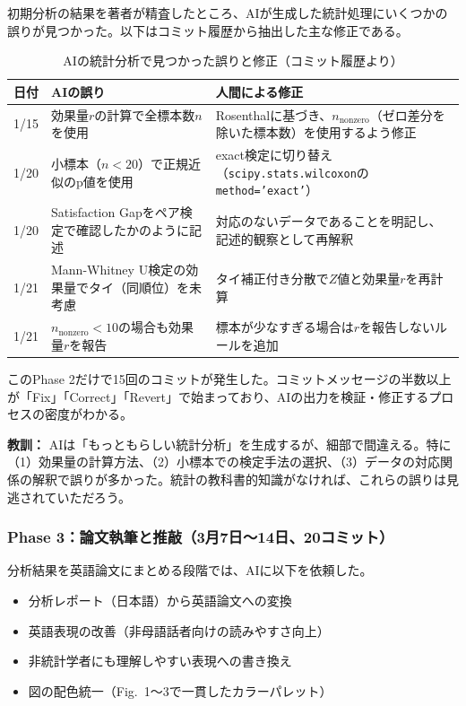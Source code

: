 初期分析の結果を著者が精査したところ、AIが生成した統計処理にいくつかの誤りが見つかった。以下はコミット履歴から抽出した主な修正である。

\begin{table}[htbp]
\caption{AIの統計分析で見つかった誤りと修正（コミット履歴より）}
\label{tab:ai-stat-errors}
\centering
\footnotesize
\begin{tabular}{lp{5cm}p{4cm}}
\toprule
日付 & AIの誤り & 人間による修正 \\
\midrule
1/15 & 効果量$r$の計算で全標本数$n$を使用 & Rosenthal\cite{rosenthal1991}に基づき、$n_{\text{nonzero}}$（ゼロ差分を除いた標本数）を使用するよう修正 \\
1/20 & 小標本（$n<20$）で正規近似のp値を使用 & exact検定に切り替え（\texttt{scipy.stats.wilcoxon}の\texttt{method='exact'}） \\
1/20 & Satisfaction Gapをペア検定で確認したかのように記述 & 対応のないデータであることを明記し、記述的観察として再解釈 \\
1/21 & Mann-Whitney U検定の効果量でタイ（同順位）を未考慮 & タイ補正付き分散で$Z$値と効果量$r$を再計算 \\
1/21 & $n_{\text{nonzero}}<10$の場合も効果量$r$を報告 & 標本が少なすぎる場合は$r$を報告しないルールを追加 \\
\bottomrule
\end{tabular}
\end{table}

このPhase 2だけで15回のコミットが発生した。コミットメッセージの半数以上が「Fix」「Correct」「Revert」で始まっており、AIの出力を検証・修正するプロセスの密度がわかる。

\begin{screen}
\textbf{教訓：} AIは「もっともらしい統計分析」を生成するが、細部で間違える。特に（1）効果量の計算方法、（2）小標本での検定手法の選択、（3）データの対応関係の解釈で誤りが多かった。統計の教科書的知識がなければ、これらの誤りは見逃されていただろう。
\end{screen}

\subsubsection{Phase 3：論文執筆と推敲（3月7日〜14日、20コミット）}

分析結果を英語論文にまとめる段階では、AIに以下を依頼した。

\begin{itemize}
\item 分析レポート（日本語）から英語論文への変換
\item 英語表現の改善（非母語話者向けの読みやすさ向上）
\item 非統計学者にも理解しやすい表現への書き換え
\item 図の配色統一（Fig.\ 1〜3で一貫したカラーパレット）
\end{itemize}

